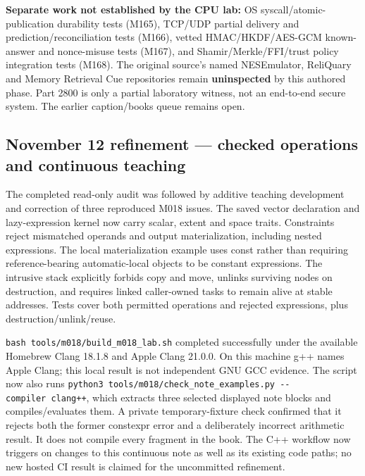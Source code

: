 \textbf{Separate work not established by the CPU lab:} OS syscall/atomic-publication durability tests (M165), TCP/UDP partial delivery and prediction/reconciliation tests (M166), vetted HMAC/HKDF/AES-GCM known-answer and nonce-misuse tests (M167), and Shamir/Merkle/FFI/trust policy integration tests (M168). The original source's named NESEmulator, ReliQuary and Memory Retrieval Cue repositories remain \textbf{uninspected} by this authored phase. Part 2800 is only a partial laboratory witness, not an end-to-end secure system. The earlier caption/books queue remains open.

\subsection{November 12 refinement --- checked operations and continuous teaching}\label{appendix-a103e7846d21-november-12-refinement-checked-operations-and-continuous-teaching}

\hypertarget{appendix-a103e7846d21-november-12-refinement-checked-operations-and-continuous-teaching}{}

The completed read-only audit was followed by additive teaching development and correction of three reproduced M018 issues. The saved vector declaration and lazy-expression kernel now carry scalar, extent and space traits. Constraints reject mismatched operands and output materialization, including nested expressions. The local materialization example uses const rather than requiring reference-bearing automatic-local objects to be constant expressions. The intrusive stack explicitly forbids copy and move, unlinks surviving nodes on destruction, and requires linked caller-owned tasks to remain alive at stable addresses. Tests cover both permitted operations and rejected expressions, plus destruction/unlink/reuse.

\texttt{bash\ tools/m018/build\_m018\_lab.sh} completed successfully under the available Homebrew Clang 18.1.8 and Apple Clang 21.0.0. On this machine g++ names Apple Clang; this local result is not independent GNU GCC evidence. The script now also runs \texttt{python3\ tools/m018/check\_note\_examples.py\ -\/-compiler\ clang++}, which extracts three selected displayed note blocks and compiles/evaluates them. A private temporary-fixture check confirmed that it rejects both the former constexpr error and a deliberately incorrect arithmetic result. It does not compile every fragment in the book. The C++ workflow now triggers on changes to this continuous note as well as its existing code paths; no new hosted CI result is claimed for the uncommitted refinement.

